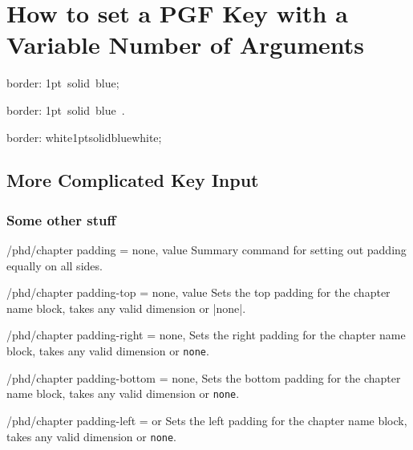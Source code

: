 \documentclass{book}
\def\borderwidth{1pt}
\def\borderstyle{solid}
\def\bordercolor{blue}
\def\borderbgcolor{white}
\begin{document}
\mainmatter




\chapter{How to set a PGF Key with a Variable Number of Arguments}
\ttfamily
{} 
border: \borderwidth\ \borderstyle\ \bordercolor;

border: \borderwidth\ \borderstyle\ \bordercolor\ .


border: \borderbgcolor \borderwidth \borderstyle \bordercolor  \borderbgcolor;


\section{More Complicated Key Input}

\subsection{Some other stuff}
\lorem


\the\chapterpaddingleft \the\chapterpaddingtop  \the\chapterpaddingbottom \the\chapterpaddingright
\rmfamily

\begin{key}{/phd/chapter padding = none, value} 
  Summary command for setting out padding equally on all sides. 
\end{key}

\begin{key}{/phd/chapter padding-top = none, value} 
  Sets the top padding for the chapter name block, takes any valid dimension or |none|.
\end{key}

\begin{key}{/phd/chapter padding-right = none, } 
  Sets the right padding for the chapter name block, takes any valid dimension or \texttt{none}.
\end{key}

\begin{key}{/phd/chapter padding-bottom = none, } 
  Sets the bottom padding for the chapter name block, takes any valid dimension or \texttt{none}.
\end{key}

\begin{key}{/phd/chapter padding-left =  or } 
  Sets the left padding for the chapter name block, takes any valid dimension or \texttt{none}.
\end{key}
\end{document}
